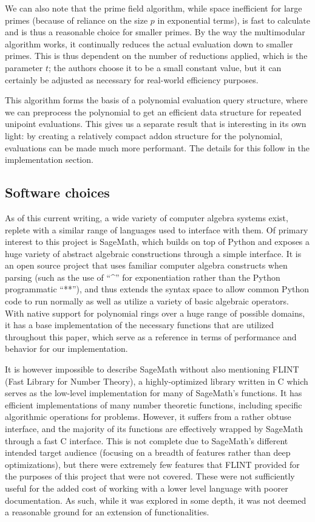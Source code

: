 \documentclass[pageno]{jpaper}
\begin{document}
We can also note that the prime field algorithm, while space inefficient for large primes (because of reliance on the size $p$ in exponential terms), is fast to calculate and is thus a reasonable choice for smaller primes.
By the way the multimodular algorithm works, it continually reduces the actual evaluation down to smaller primes.
This is thus dependent on the number of reductions applied, which is the parameter $t$; the authors choose it to be a small constant value, but it can certainly be adjusted as necessary for real-world efficiency purposes.

This algorithm forms the basis of a polynomial evaluation query structure, where we can preprocess the polynomial to get an efficient data structure for repeated unipoint evaluations.
This gives us a separate result that is interesting in its own light: by creating a relatively compact addon structure for the polynomial, evaluations can be made much more performant.
The details for this follow in the implementation section.

\subsection{Software choices}
As of this current writing, a wide variety of computer algebra systems exist, replete with a similar range of languages used to interface with them.
Of primary interest to this project is SageMath, which builds on top of Python and exposes a huge variety of abstract algebraic constructions through a simple interface.
It is an open source project that uses familiar computer algebra constructs when parsing (such as the use of ``\^{}'' for exponentiation rather than the Python programmatic ``**''), and thus extends the syntax space to allow common Python code to run normally as well as utilize a variety of basic algebraic operators.
With native support for polynomial rings over a huge range of possible domains, it has a base implementation of the necessary functions that are utilized throughout this paper, which serve as a reference in terms of performance and behavior for our implementation.

It is however impossible to describe SageMath without also mentioning FLINT (Fast Library for Number Theory), a highly-optimized library written in C which serves as the low-level implementation for many of SageMath's functions.
It has efficient implementations of many number theoretic functions, including specific algorithmic operations for problems.
However, it suffers from a rather obtuse interface, and the majority of its functions are effectively wrapped by SageMath through a fast C interface.
This is not complete due to SageMath's different intended target audience (focusing on a breadth of features rather than deep optimizations), but there were extremely few features that FLINT provided for the purposes of this project that were not covered.
These were not sufficiently useful for the added cost of working with a lower level language with poorer documentation.
As such, while it was explored in some depth, it was not deemed a reasonable ground for an extension of functionalities.
\end{document}
